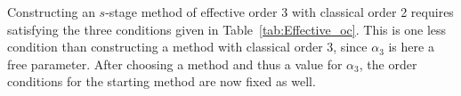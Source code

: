 \begin{example}\label{ex:Effective_RK32}
	Constructing an $s$-stage method of effective order 3 with classical order 2 requires satisfying the three conditions given in Table~\ref{tab:Effective_oc}. This is one less condition than constructing a method with classical order 3, since $\alpha_3$ is here a free parameter. After choosing a method and thus a value for $\alpha_3$, the order conditions for the starting method are now fixed as well.
\end{example}

